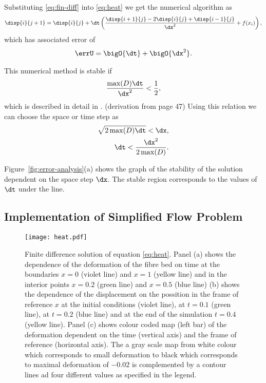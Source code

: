\documentclass[twoside,a4paper,12pt,draft]{article}
\newcommand{\figref}[1]{Figure~\ref{#1}}
\newcommand{\note}[1]{{\color{red}(#1)}}
\newcommand{\note}[1]{}
\begin{document}
Substituting \eqref{eq:fin-diff} into \eqref{eq:heat} we get the
numerical algorithm as
%
\begin{align}
\disp{i}{j+1}  =   \disp{i}{j} + \dt\left(\frac{\disp{i+1}{j} - 2\disp{i}{j} + \disp{i-1}{j}}{\dx^2}   + f(x_i) \right), \label{eq:findiff-alg}
\end{align}
%
which has associated error of
\begin{align}
  \errU =\bigO{\dt} + \bigO{\dx^2}.
\end{align}

This numerical method is stable if
\begin{align}
  \frac{\max(D)\dt}{\dx^2} < \frac{1}{2},
\end{align}
which is described in detail in \cite{Strikwerda2004}.
%
\note{derivation from page 47}
%
Using this relation we can choose the space or time step as
%
\begin{align}
  \sqrt{2\max(D)\dt} < \dx, \\
  \dt < \frac{\dx^2}{2\max(D)}.\label{eq:stable-boundary}
\end{align}

\figref{fig:error-analysis}(a) shows the graph of the stability of the
solution dependent on the space step $\dx$. The stable region
corresponds to the values of $\dt$ under the line.

\subsection{Implementation of Simplified Flow Problem}

\begin{figure}
  \centering
  \texttt{[image: heat.pdf]}
  \caption{Finite difference solution of equation
    \eqref{eq:heat}. Panel (a) shows the dependence of the deformation
    of the fibre bed on time at the boundaries $x=0$ (violet line) and
    $x=1$ (yellow line) and in the interior points $x=0.2$ (green
    line) and $x=0.5$ (blue line) (b) shows the dependence of the
    displacement on the possition in the frame of reference $x$ at the
    initial conditions (violet line), at $t=0.1$ (green line), at
    $t=0.2$ (blue line) and at the end of the simulation $t=0.4$
    (yellow line).  Panel (c) shows colour coded map (left bar) of the
    deformation dependent on the time (vertical axis) and the frame of
    reference (horizontal axis). The a gray scale map from white
    colour which corresponds to small deformation to black which
    corresponds to maximal deformation of $-0.02$ is complemented by a
    contour lines ad four different values as specified in the legend.}
  \label{fig:findiff-heat}
\end{figure}
\end{document}
